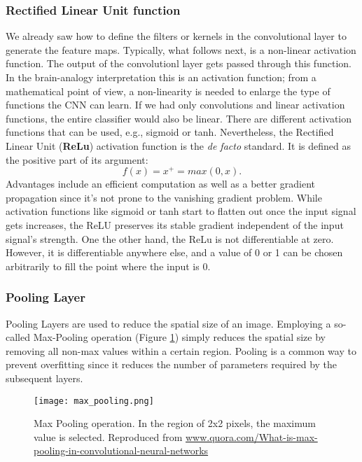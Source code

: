 \documentclass[a4paper, 11pt, twoside, openright]{article}
\begin{document}
\subsubsection{Rectified Linear Unit function} \label{subsub:relulayer}
We already saw how to define the filters or kernels in the convolutional layer to generate the feature maps. Typically, what follows next, is a non-linear activation function. The output of the convolutionl layer gets passed through this function. In the brain-analogy interpretation this is an activation function; from a mathematical point of view, a non-linearity is needed to enlarge the type of functions the CNN can learn. If we had only convolutions and linear activation functions, the entire classifier would also be linear.
There are different activation functions that can be used, e.g., sigmoid or tanh. Nevertheless, the Rectified Linear Unit (\textbf{ReLu}) activation function is the \textit{de facto} standard. It is defined as the positive part of its argument:
\begin{equation}
f(x) = x^+ = max(0, x).
\end{equation}
Advantages include an efficient computation as well as a better gradient propagation since it's not prone to the vanishing gradient problem. While activation functions like sigmoid or tanh start to flatten out once the input signal gets increases, the ReLU preserves its stable gradient independent of the input signal's strength. One the other hand, the ReLu is not differentiable at zero. However, it is differentiable anywhere else, and a value of 0 or 1 can be chosen arbitrarily to fill the point where the input is 0.
\subsubsection{Pooling Layer} \label{subsub:player}
Pooling Layers are used to reduce the spatial size of an image. Employing a so-called Max-Pooling operation (Figure \ref{max_pooling}) simply reduces the spatial size by removing all non-max values within a certain region.
Pooling is a common way to prevent overfitting since it reduces the number of parameters required by the subsequent layers. \\
\begin{figure}[h!]
	\centering
  \texttt{[image: max\_pooling.png]}
	\caption{Max Pooling operation. In the region of 2x2 pixels, the maximum value is selected. Reproduced from \url{www.quora.com/What-is-max-pooling-in-convolutional-neural-networks}}
	\label{max_pooling}
\end{figure}
\end{document}
